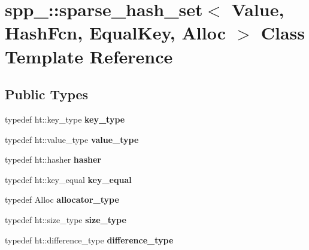 \hypertarget{classspp___1_1sparse__hash__set}{}\section{spp\+\_\+\+:\+:sparse\+\_\+hash\+\_\+set$<$ Value, Hash\+Fcn, Equal\+Key, Alloc $>$ Class Template Reference}
\label{classspp___1_1sparse__hash__set}
\subsection*{Public Types}
\begin{DoxyCompactItemize}
\item 
typedef ht\+::key\+\_\+type {\bfseries key\+\_\+type}\hypertarget{classspp___1_1sparse__hash__set_a55353b38bb133170390e7d3a39b54adb}{}\label{classspp___1_1sparse__hash__set_a55353b38bb133170390e7d3a39b54adb}

\item 
typedef ht\+::value\+\_\+type {\bfseries value\+\_\+type}\hypertarget{classspp___1_1sparse__hash__set_a93645918b8bb575b4100ea2b1ad5de75}{}\label{classspp___1_1sparse__hash__set_a93645918b8bb575b4100ea2b1ad5de75}

\item 
typedef ht\+::hasher {\bfseries hasher}\hypertarget{classspp___1_1sparse__hash__set_a3dd6dfbda355cc8f1d54a1acad9070b9}{}\label{classspp___1_1sparse__hash__set_a3dd6dfbda355cc8f1d54a1acad9070b9}

\item 
typedef ht\+::key\+\_\+equal {\bfseries key\+\_\+equal}\hypertarget{classspp___1_1sparse__hash__set_abf1527fc483788a20e2beaef63cd8bf8}{}\label{classspp___1_1sparse__hash__set_abf1527fc483788a20e2beaef63cd8bf8}

\item 
typedef Alloc {\bfseries allocator\+\_\+type}\hypertarget{classspp___1_1sparse__hash__set_a57e76aa96c215133d2df0b6919fe6c0d}{}\label{classspp___1_1sparse__hash__set_a57e76aa96c215133d2df0b6919fe6c0d}

\item 
typedef ht\+::size\+\_\+type {\bfseries size\+\_\+type}\hypertarget{classspp___1_1sparse__hash__set_a5b57bd58fd71c5cc1ae424b9c2c08037}{}\label{classspp___1_1sparse__hash__set_a5b57bd58fd71c5cc1ae424b9c2c08037}

\item 
typedef ht\+::difference\+\_\+type {\bfseries difference\+\_\+type}\hypertarget{classspp___1_1sparse__hash__set_aee549a790417c7233e9611da250c72f8}{}\label{classspp___1_1sparse__hash__set_aee549a790417c7233e9611da250c72f8}


\end{DoxyCompactItemize}
